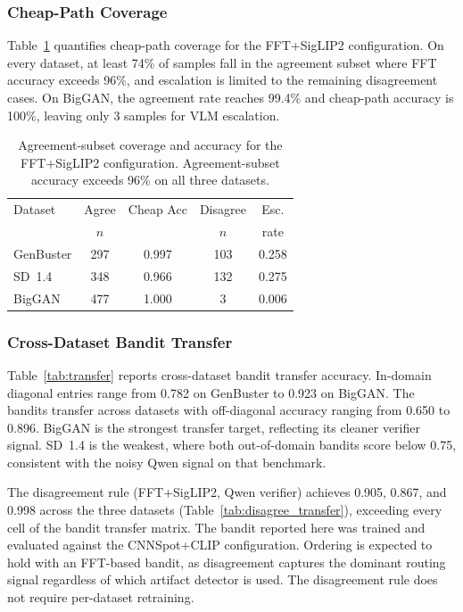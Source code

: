 \documentclass{ieeeaccess}
\begin{document}
\subsubsection{Cheap-Path Coverage}

Table~\ref{tab:cheap_path} quantifies cheap-path coverage for the FFT+SigLIP2
configuration. On every dataset, at least 74\% of samples fall in the agreement subset where FFT accuracy exceeds 96\%, and escalation is limited to the remaining disagreement
cases. On BigGAN, the agreement rate reaches 99.4\% and cheap-path accuracy is 100\%,
leaving only 3 samples for VLM escalation.

\FloatBarrier
\begin{table}[h]
\centering
\caption{Agreement-subset coverage and accuracy for the FFT+SigLIP2 configuration.
Agreement-subset accuracy exceeds 96\% on all three datasets.}

\label{tab:cheap_path}
\begin{tabular}{lcccc}
\toprule
Dataset & Agree & Cheap Acc & Disagree & Esc. \\
        & $n$   &           & $n$      & rate \\
\midrule
GenBuster & 297 & 0.997 & 103 & 0.258 \\
SD~1.4    & 348 & 0.966 & 132 & 0.275 \\
BigGAN    & 477 & 1.000 &   3 & 0.006 \\
\bottomrule
\end{tabular}
\end{table}
\FloatBarrier


\subsubsection{Cross-Dataset Bandit Transfer}

Table~\ref{tab:transfer} reports cross-dataset bandit transfer accuracy. In-domain
diagonal entries range from 0.782 on GenBuster to 0.923 on BigGAN. The bandits transfer
across datasets with off-diagonal accuracy ranging from 0.650 to 0.896. BigGAN is the
strongest transfer target, reflecting its cleaner verifier signal. SD~1.4 is the weakest,
where both out-of-domain bandits score below 0.75, consistent with the noisy Qwen signal
on that benchmark.

The disagreement rule (FFT+SigLIP2, Qwen verifier) achieves 0.905, 0.867, and 0.998
across the three datasets (Table~\ref{tab:disagree_transfer}), exceeding every cell of
the bandit transfer matrix. The bandit reported here was trained and evaluated against
the CNNSpot+CLIP configuration. Ordering is expected to hold with an FFT-based
bandit, as disagreement captures the dominant routing signal regardless of which
artifact detector is used. The disagreement rule does not require per-dataset retraining.
\end{document}
